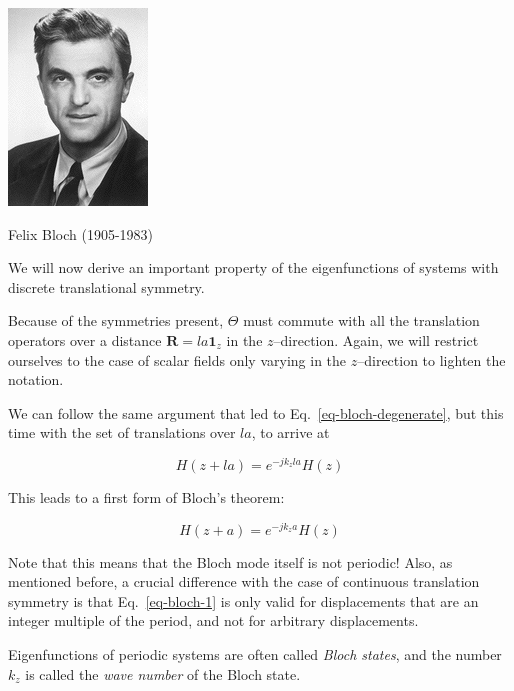 
\begin{marginfigure}[-0.0cm]
  \includegraphics{symmetry/figures/bloch}
  \caption{Felix Bloch (1905-1983)}
\end{marginfigure}

We will now derive an important property of the eigenfunctions of systems with discrete translational symmetry.

Because of the symmetries present, $\Theta$ must commute with all the translation operators over a distance ${\mathbf R} = l a {\mathbf 1}_z$ in the $z$--direction. Again, we will restrict ourselves to the case of scalar fields only varying in the $z$--direction to lighten the notation.

We can follow the same argument that led to Eq.~\ref{eq-bloch-degenerate}, but this time with the set of translations over $la$, to arrive at

\begin{equation}
H(z + la) = e^{-j k_z la} H(z)
\end{equation} 

This leads to a first form of Bloch's theorem:

\begin{equation}
H(z + a) = e^{-j k_z a} H(z) \label{eq-bloch-1}
\end{equation} 

Note that this means that the Bloch mode itself is not periodic! Also, as mentioned before, a crucial difference with the case of continuous translation symmetry is that Eq.~\ref{eq-bloch-1} is only valid for displacements that are an integer multiple of the period, and not for arbitrary displacements.

\noindent{}Eigenfunctions of periodic systems are often called \emph{Bloch states}, and the number $k_z$ is called the \emph{wave number} of the Bloch state. 

